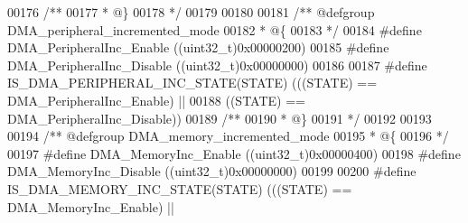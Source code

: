 \begin{DoxyCode}
00176 \textcolor{comment}{/**}
00177 \textcolor{comment}{  * @\}}
00178 \textcolor{comment}{  */}
00179 
00180 
00181 \textcolor{comment}{/** @defgroup DMA\_peripheral\_incremented\_mode }
00182 \textcolor{comment}{  * @\{}
00183 \textcolor{comment}{  */}
00184 \textcolor{preprocessor}{#}\textcolor{preprocessor}{define} \textcolor{preprocessor}{DMA\_PeripheralInc\_Enable}          \textcolor{preprocessor}{(}\textcolor{preprocessor}{(}\textcolor{preprocessor}{uint32\_t}\textcolor{preprocessor}{)}0x00000200\textcolor{preprocessor}{)}
00185 \textcolor{preprocessor}{#}\textcolor{preprocessor}{define} \textcolor{preprocessor}{DMA\_PeripheralInc\_Disable}         \textcolor{preprocessor}{(}\textcolor{preprocessor}{(}\textcolor{preprocessor}{uint32\_t}\textcolor{preprocessor}{)}0x00000000\textcolor{preprocessor}{)}
00186 
00187 \textcolor{preprocessor}{#}\textcolor{preprocessor}{define} \textcolor{preprocessor}{IS\_DMA\_PERIPHERAL\_INC\_STATE}\textcolor{preprocessor}{(}\textcolor{preprocessor}{STATE}\textcolor{preprocessor}{)} \textcolor{preprocessor}{(}\textcolor{preprocessor}{(}\textcolor{preprocessor}{(}\textcolor{preprocessor}{STATE}\textcolor{preprocessor}{)} \textcolor{preprocessor}{==} 
      DMA_PeripheralInc_Enable\textcolor{preprocessor}{)} \textcolor{preprocessor}{||}
00188                                             \textcolor{preprocessor}{(}\textcolor{preprocessor}{(}\textcolor{preprocessor}{STATE}\textcolor{preprocessor}{)} \textcolor{preprocessor}{==} 
      DMA_PeripheralInc_Disable\textcolor{preprocessor}{)}\textcolor{preprocessor}{)}
00189 \textcolor{comment}{/**}
00190 \textcolor{comment}{  * @\}}
00191 \textcolor{comment}{  */}
00192 
00193 
00194 \textcolor{comment}{/** @defgroup DMA\_memory\_incremented\_mode }
00195 \textcolor{comment}{  * @\{}
00196 \textcolor{comment}{  */}
00197 \textcolor{preprocessor}{#}\textcolor{preprocessor}{define} \textcolor{preprocessor}{DMA\_MemoryInc\_Enable}              \textcolor{preprocessor}{(}\textcolor{preprocessor}{(}\textcolor{preprocessor}{uint32\_t}\textcolor{preprocessor}{)}0x00000400\textcolor{preprocessor}{)}
00198 \textcolor{preprocessor}{#}\textcolor{preprocessor}{define} \textcolor{preprocessor}{DMA\_MemoryInc\_Disable}             \textcolor{preprocessor}{(}\textcolor{preprocessor}{(}\textcolor{preprocessor}{uint32\_t}\textcolor{preprocessor}{)}0x00000000\textcolor{preprocessor}{)}
00199 
00200 \textcolor{preprocessor}{#}\textcolor{preprocessor}{define} \textcolor{preprocessor}{IS\_DMA\_MEMORY\_INC\_STATE}\textcolor{preprocessor}{(}\textcolor{preprocessor}{STATE}\textcolor{preprocessor}{)} \textcolor{preprocessor}{(}\textcolor{preprocessor}{(}\textcolor{preprocessor}{(}\textcolor{preprocessor}{STATE}\textcolor{preprocessor}{)} \textcolor{preprocessor}{==} DMA_MemoryInc_Enable\textcolor{preprocessor}{)} \textcolor{preprocessor}{||}

\end{DoxyCode}
